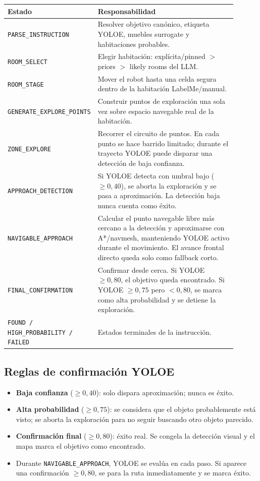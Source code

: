 \documentclass[11pt,a4paper]{article}
\begin{document}
\begin{center}
\begin{tabular}{p{0.28\linewidth}p{0.62\linewidth}}
\toprule
\textbf{Estado} & \textbf{Responsabilidad} \\
\midrule
\texttt{PARSE\_INSTRUCTION} &
Resolver objetivo canónico, etiqueta YOLOE, muebles surrogate y habitaciones probables. \\
\texttt{ROOM\_SELECT} &
Elegir habitación: explícita/pinned $>$ priors $>$ likely rooms del LLM. \\
\texttt{ROOM\_STAGE} &
Mover el robot hasta una celda segura dentro de la habitación LabelMe/manual. \\
\texttt{GENERATE\_EXPLORE\_POINTS} &
Construir puntos de exploración una sola vez sobre espacio navegable real de la habitación. \\
\texttt{ZONE\_EXPLORE} &
Recorrer el circuito de puntos. En cada punto se hace barrido limitado; durante el trayecto
YOLOE puede disparar una detección de baja confianza. \\
\texttt{APPROACH\_DETECTION} &
Si YOLOE detecta con umbral bajo ($\geq 0{,}40$), se aborta la exploración y se pasa a
aproximación. La detección baja nunca cuenta como éxito. \\
\texttt{NAVIGABLE\_APPROACH} &
Calcular el punto navegable libre más cercano a la detección y aproximarse con A*/navmesh,
manteniendo YOLOE activo durante el movimiento. El avance frontal directo queda solo como
fallback corto. \\
\texttt{FINAL\_CONFIRMATION} &
Confirmar desde cerca. Si YOLOE $\geq 0{,}80$, el objetivo queda encontrado. Si YOLOE
$\geq 0{,}75$ pero $<0{,}80$, se marca como alta probabilidad y se detiene la exploración. \\
\texttt{FOUND / HIGH\_PROBABILITY / FAILED} &
Estados terminales de la instrucción. \\
\bottomrule
\end{tabular}
\end{center}

\subsection{Reglas de confirmación YOLOE}

\begin{itemize}
  \item \textbf{Baja confianza} ($\geq 0{,}40$): solo dispara aproximación; nunca es éxito.
  \item \textbf{Alta probabilidad} ($\geq 0{,}75$): se considera que el objeto probablemente
        está visto; se aborta la exploración para no seguir buscando otro objeto parecido.
  \item \textbf{Confirmación final} ($\geq 0{,}80$): éxito real. Se congela la detección
        visual y el mapa marca el objetivo como encontrado.
  \item Durante \texttt{NAVIGABLE\_APPROACH}, YOLOE se evalúa en cada paso. Si aparece
        una confirmación $\geq 0{,}80$, se para la ruta inmediatamente y se marca éxito.
\end{itemize}
\end{document}
